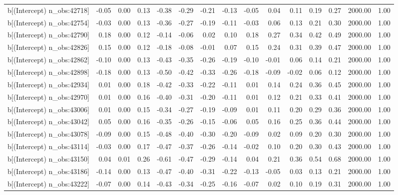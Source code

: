 \begin{table}[ht]
\begin{tabular}{rrrrrrrrrrrrrrr}
  b[(Intercept) n\_obs:42718] & -0.05 & 0.00 & 0.13 & -0.38 & -0.29 & -0.21 & -0.13 & -0.05 & 0.04 & 0.11 & 0.19 & 0.27 & 2000.00 & 1.00 \\ 
  b[(Intercept) n\_obs:42754] & -0.03 & 0.00 & 0.13 & -0.36 & -0.27 & -0.19 & -0.11 & -0.03 & 0.06 & 0.13 & 0.21 & 0.30 & 2000.00 & 1.00 \\ 
  b[(Intercept) n\_obs:42790] & 0.18 & 0.00 & 0.12 & -0.14 & -0.06 & 0.02 & 0.10 & 0.18 & 0.27 & 0.34 & 0.42 & 0.49 & 2000.00 & 1.00 \\ 
  b[(Intercept) n\_obs:42826] & 0.15 & 0.00 & 0.12 & -0.18 & -0.08 & -0.01 & 0.07 & 0.15 & 0.24 & 0.31 & 0.39 & 0.47 & 2000.00 & 1.00 \\ 
  b[(Intercept) n\_obs:42862] & -0.10 & 0.00 & 0.13 & -0.43 & -0.35 & -0.26 & -0.19 & -0.10 & -0.01 & 0.06 & 0.14 & 0.21 & 2000.00 & 1.00 \\ 
  b[(Intercept) n\_obs:42898] & -0.18 & 0.00 & 0.13 & -0.50 & -0.42 & -0.33 & -0.26 & -0.18 & -0.09 & -0.02 & 0.06 & 0.12 & 2000.00 & 1.00 \\ 
  b[(Intercept) n\_obs:42934] & 0.01 & 0.00 & 0.18 & -0.42 & -0.33 & -0.22 & -0.11 & 0.01 & 0.14 & 0.24 & 0.36 & 0.45 & 2000.00 & 1.00 \\ 
  b[(Intercept) n\_obs:42970] & 0.01 & 0.00 & 0.16 & -0.40 & -0.31 & -0.20 & -0.11 & 0.01 & 0.12 & 0.21 & 0.33 & 0.41 & 2000.00 & 1.00 \\ 
  b[(Intercept) n\_obs:43006] & 0.01 & 0.00 & 0.15 & -0.34 & -0.27 & -0.19 & -0.09 & 0.01 & 0.11 & 0.20 & 0.29 & 0.36 & 2000.00 & 1.00 \\ 
  b[(Intercept) n\_obs:43042] & 0.05 & 0.00 & 0.16 & -0.35 & -0.26 & -0.15 & -0.06 & 0.05 & 0.16 & 0.25 & 0.36 & 0.44 & 2000.00 & 1.00 \\ 
  b[(Intercept) n\_obs:43078] & -0.09 & 0.00 & 0.15 & -0.48 & -0.40 & -0.30 & -0.20 & -0.09 & 0.02 & 0.09 & 0.20 & 0.30 & 2000.00 & 1.00 \\ 
  b[(Intercept) n\_obs:43114] & -0.03 & 0.00 & 0.17 & -0.47 & -0.37 & -0.26 & -0.14 & -0.02 & 0.10 & 0.20 & 0.30 & 0.43 & 2000.00 & 1.00 \\ 
  b[(Intercept) n\_obs:43150] & 0.04 & 0.01 & 0.26 & -0.61 & -0.47 & -0.29 & -0.14 & 0.04 & 0.21 & 0.36 & 0.54 & 0.68 & 2000.00 & 1.00 \\ 
  b[(Intercept) n\_obs:43186] & -0.14 & 0.00 & 0.13 & -0.47 & -0.40 & -0.31 & -0.22 & -0.13 & -0.05 & 0.03 & 0.13 & 0.21 & 2000.00 & 1.00 \\ 
  b[(Intercept) n\_obs:43222] & -0.07 & 0.00 & 0.14 & -0.43 & -0.34 & -0.25 & -0.16 & -0.07 & 0.02 & 0.10 & 0.19 & 0.31 & 2000.00 & 1.00 \\ 

\end{tabular}
\end{table}
